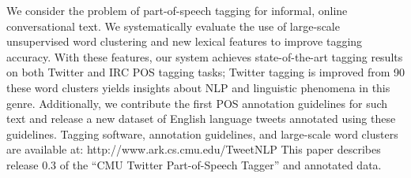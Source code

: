 We consider the problem of part-of-speech tagging for informal, online conversational text.  We systematically evaluate the use of large-scale
 unsupervised word clustering and new lexical features to improve tagging
 accuracy. With these features, our system achieves state-of-the-art tagging
 results on both Twitter and IRC POS tagging tasks; Twitter tagging is improved
 from 90%
 these word clusters yields insights about NLP and linguistic phenomena in this
 genre.                                Additionally, we contribute the first POS
 annotation
 guidelines
 for
 such text and release a new dataset of English language tweets annotated using
 these guidelines.  
 Tagging software, annotation guidelines, and large-scale word clusters are
 available at: http://www.ark.cs.cmu.edu/TweetNLP
 This paper describes release 0.3 of the ``CMU Twitter Part-of-Speech Tagger'' and
 annotated data.

